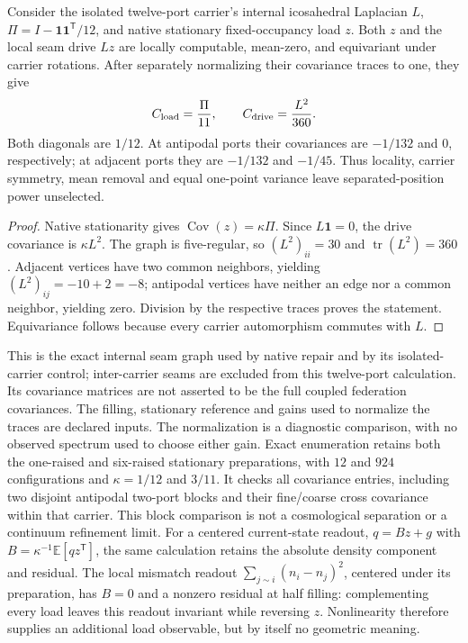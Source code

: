 \begin{proposition}
Consider the isolated twelve-port carrier's internal icosahedral Laplacian \(L\),
\(\Pi=I-\mathbf1\mathbf1^{\mathsf T}/12\), and native stationary
fixed-occupancy load \(z\). Both \(z\) and the local seam drive \(Lz\)
are locally computable, mean-zero, and equivariant under carrier rotations.
After separately normalizing their covariance traces to one, they give
\[
 C_{\rm load}=\frac{\Pi}{11},\qquad
 C_{\rm drive}=\frac{L^2}{360}.
\]
Both diagonals are \(1/12\). At antipodal ports their covariances are
\(-1/132\) and \(0\), respectively; at adjacent ports they are
\(-1/132\) and \(-1/45\). Thus locality, carrier symmetry, mean removal
and equal one-point variance leave separated-position power unselected.
\end{proposition}
\begin{proof}
Native stationarity gives \(\operatorname{Cov}(z)=\kappa\Pi\).
Since \(L\mathbf1=0\), the drive covariance is \(\kappa L^2\).
The graph is five-regular, so \((L^2)_{ii}=30\) and
\(\operatorname{tr}(L^2)=360\). Adjacent vertices have two common
neighbors, yielding \((L^2)_{ij}=-10+2=-8\); antipodal vertices have
neither an edge nor a common neighbor, yielding zero. Division by the
respective traces proves the statement. Equivariance follows because every
carrier automorphism commutes with \(L\).
\end{proof}

This is the exact internal seam graph used by native repair and by its
isolated-carrier control; inter-carrier seams are excluded from this
twelve-port calculation. Its covariance matrices are not asserted to be
the full coupled federation covariances. The filling, stationary reference
and gains used to normalize the traces are declared inputs. The normalization
is a diagnostic comparison, with no observed spectrum used to choose either gain. Exact enumeration retains both the one-raised
and six-raised stationary preparations, with \(12\) and \(924\)
configurations and \(\kappa=1/12\) and \(3/11\). It checks all covariance
entries, including two disjoint antipodal two-port blocks and their
fine/coarse cross covariance within that carrier. This block comparison
is not a cosmological separation or a continuum refinement limit. For a
centered current-state readout,
\(q=Bz+g\) with \(B=\kappa^{-1}\mathbb E[qz^{\mathsf T}]\),
the same calculation retains the absolute density component and residual.
The local mismatch readout
\(\sum_{j\sim i}(n_i-n_j)^2\), centered under its preparation, has
\(B=0\) and a nonzero residual at half filling: complementing every load
leaves this readout invariant while reversing \(z\). Nonlinearity therefore
supplies an additional load observable, but by itself no geometric meaning.

